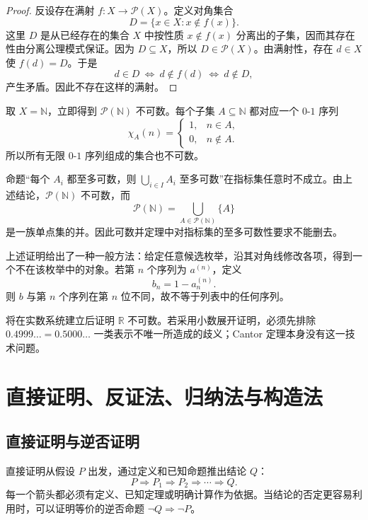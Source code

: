 \begin{proof}
反设存在满射 \(f:X\to\mathcal P(X)\)。定义对角集合
\[
  D=\{x\in X:x\notin f(x)\}.
\]
这里 \(D\) 是从已经存在的集合 \(X\) 中按性质 \(x\notin f(x)\) 分离出的子集，因而其存在性由分离公理模式保证。因为 \(D\subseteq X\)，所以 \(D\in\mathcal P(X)\)。由满射性，存在 \(d\in X\) 使 \(f(d)=D\)。于是
\[
  d\in D
  \ \Leftrightarrow\ d\notin f(d)
  \ \Leftrightarrow\ d\notin D,
\]
产生矛盾。因此不存在这样的满射。
\end{proof}

取 \(X=\mathbb N\)，立即得到 \(\mathcal P(\mathbb N)\) 不可数。每个子集 \(A\subseteq\mathbb N\) 都对应一个 \(0\)-\(1\) 序列
\[
  \chi_A(n)=
  \begin{cases}
    1,&n\in A,\\
    0,&n\notin A.
  \end{cases}
\]
所以所有无限 \(0\)-\(1\) 序列组成的集合也不可数。

\begin{counterexample}[不可数指标并]
命题“每个 \(A_i\) 都至多可数，则 \(\bigcup_{i\in I}A_i\) 至多可数”在指标集任意时不成立。由上述结论，\(\mathcal P(\mathbb N)\) 不可数，而
\[
  \mathcal P(\mathbb N)
  =\bigcup_{A\in\mathcal P(\mathbb N)}\{A\}
\]
是一族单点集的并。因此可数并定理中对指标集的至多可数性要求不能删去。
\end{counterexample}

上述证明给出了一种一般方法：给定任意候选枚举，沿其对角线修改各项，得到一个不在该枚举中的对象。若第 \(n\) 个序列为 \(a^{(n)}\)，定义
\[
  b_n=1-a_n^{(n)}.
\]
则 \(b\) 与第 \(n\) 个序列在第 \(n\) 位不同，故不等于列表中的任何序列。

\begin{remark}
将在实数系统建立后证明 \(\mathbb R\) 不可数。若采用小数展开证明，必须先排除 \(0.4999\ldots=0.5000\ldots\) 一类表示不唯一所造成的歧义；Cantor 定理本身没有这一技术问题。
\end{remark}

\section{直接证明、反证法、归纳法与构造法}


\subsection{直接证明与逆否证明}

直接证明从假设 \(P\) 出发，通过定义和已知命题推出结论 \(Q\)：
\[
  P\Rightarrow P_1\Rightarrow P_2\Rightarrow\cdots\Rightarrow Q.
\]
每一个箭头都必须有定义、已知定理或明确计算作为依据。当结论的否定更容易利用时，可以证明等价的逆否命题 \(\neg Q\Rightarrow\neg P\)。

